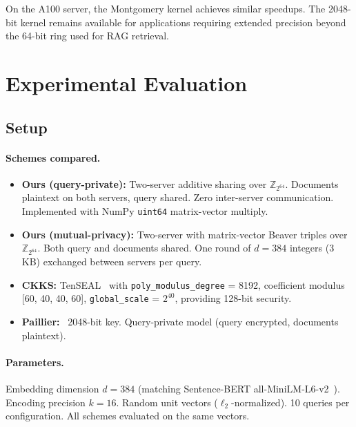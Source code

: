 \documentclass[11pt]{article}
\newcommand{\Z}{\mathbb{Z}}
\begin{document}
On the A100 server, the Montgomery kernel achieves similar speedups. The 2048-bit kernel remains available for applications requiring extended precision beyond the 64-bit ring used for RAG retrieval.


\section{Experimental Evaluation}
\label{sec:experiments}

\subsection{Setup}

\paragraph{Schemes compared.}
\begin{itemize}[leftmargin=*]
\item \textbf{Ours (query-private):} Two-server additive sharing over $\Z_{2^{64}}$. Documents plaintext on both servers, query shared. Zero inter-server communication. Implemented with NumPy \texttt{uint64} matrix-vector multiply.
\item \textbf{Ours (mutual-privacy):} Two-server with matrix-vector Beaver triples over $\Z_{2^{64}}$. Both query and documents shared. One round of $d = 384$ integers (3 KB) exchanged between servers per query.
\item \textbf{CKKS:} TenSEAL~\cite{benaissa2021tenseal} with \texttt{poly\_modulus\_degree} = 8192, coefficient modulus [60, 40, 40, 60], \texttt{global\_scale} = $2^{40}$, providing 128-bit security.
\item \textbf{Paillier:}~\cite{paillier1999public} 2048-bit key. Query-private model (query encrypted, documents plaintext).
\end{itemize}

\paragraph{Parameters.} Embedding dimension $d = 384$ (matching Sentence-BERT all-MiniLM-L6-v2~\cite{reimers2019sentence}). Encoding precision $k = 16$. Random unit vectors ($\ell_2$-normalized). 10 queries per configuration. All schemes evaluated on the same vectors.
\end{document}
